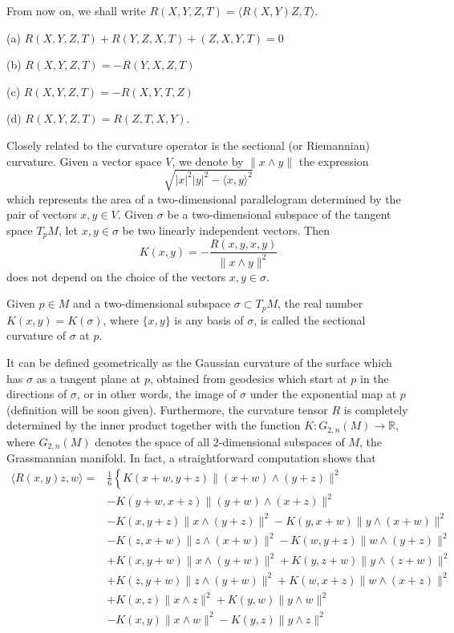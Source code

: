 \documentclass{ctexart}
\begin{document}
From now on, we shall write $R(X, Y, Z, T) = \langle R(X, Y)Z, T\rangle$. 
\begin{proposition}
    (a) $R(X, Y,Z,T)+R(Y,Z,X, T)+(Z,X, Y, T) = 0 $

    (b) $R(X,Y,Z,T) = -R(Y,X,Z,T) $

    (c) $R(X, Y, Z, T) = -R(X, Y, T, Z) $

    (d) $R(X, Y, Z, T) = R(Z, T, X, Y). $
\end{proposition}

Closely related to the curvature operator is the sectional (or Riemannian) curvature.
Given a vector space $V$, we denote by $\|x \wedge y\|$ the expression
$$
\sqrt{|x|^2|y|^2-\langle x, y\rangle^2}
$$
which represents the area of a two-dimensional parallelogram determined by the pair of vectors $x, y \in V$.
Given $\sigma$ be a two-dimensional subspace of the tangent space $T_p M$, let $x, y \in \sigma$ be two linearly independent vectors. Then
$$
K(x, y)=-\frac{R(x, y, x, y)}{\|x \wedge y\|^2}
$$
does not depend on the choice of the vectors $x, y \in \sigma$.

\begin{definition}
    Given $p \in M$ and a two-dimensional subspace $\sigma \subset T_p M$, the real number $K(x, y)=K(\sigma)$, where $\{x, y\}$ is any basis of $\sigma$, is called the sectional curvature of $\sigma$ at $p$.
\end{definition}
It can be defined geometrically as the Gaussian curvature of the surface which has $\sigma$ as a tangent plane at $p$, obtained from geodesics which start at $p$ in the directions of $\sigma$, 
or in other words, the image of $\sigma$ under the exponential map at $p$ (definition will be soon given). 
Furthermore, the curvature tensor $R$ is completely determined by the inner product together with the function $K: G_{2, n}\left(M\right) \rightarrow \mathbb{R}$, where $G_{2, n}\left(M\right)$ denotes the space of all $2$-dimensional
subspaces of $M$, the Grassmannian manifold. In fact, a straightforward computation shows that
$$
\begin{aligned}
\langle R(x, y) z, w\rangle= & \frac{1}{6}\left\{K(x+w, y+z)\|(x+w) \wedge(y+z)\|^2\right. \\
& -K(y+w, x+z)\|(y+w) \wedge(x+z)\|^2 \\
& -K(x, y+z)\|x \wedge(y+z)\|^2-K(y, x+w)\|y \wedge(x+w)\|^2 \\
& -K(z, x+w)\|z \wedge(x+w)\|^2-K(w, y+z)\|w \wedge(y+z)\|^2 \\
& +K(x, y+w)\|x \wedge(y+w)\|^2+K(y, z+w)\|y \wedge(z+w)\|^2 \\
& +K(z, y+w)\|z \wedge(y+w)\|^2+K(w, x+z)\|w \wedge(x+z)\|^2 \\
& +K(x, z)\|x \wedge z\|^2+K(y, w)\|y \wedge w\|^2 \\
& -K(x, y)\|x \wedge w\|^2-K(y, z)\|y \wedge z\|^2
\end{aligned}
$$
\end{document}
